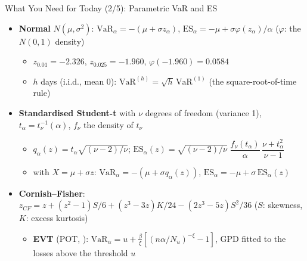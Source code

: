 \begin{frame}{What You Need for Today (2/5): Parametric VaR and ES}
\itemsize{\small}
\begin{itemize}
    \item \textbf{Normal} $N(\mu, \sigma^2)$: $\mathrm{VaR}_\alpha = -(\mu + \sigma z_\alpha)$, $\mathrm{ES}_\alpha = -\mu + \sigma\varphi(z_\alpha)/\alpha$ ($\varphi$: the $N(0,1)$ density)
    \begin{itemize}
        \item $z_{0.01} = -2.326$, $z_{0.025} = -1.960$, $\varphi(-1.960) = 0.0584$
        \item $h$ days (i.i.d., mean 0): $\mathrm{VaR}^{(h)} = \sqrt{h}\,\mathrm{VaR}^{(1)}$ (the square-root-of-time rule)
    \end{itemize}
    \item \textbf{Standardised Student-t} with $\nu$ degrees of freedom (variance 1), $t_\alpha = t_\nu^{-1}(\alpha)$, $f_\nu$ the density of $t_\nu$
    \begin{itemize}
        \item $q_\alpha(z) = t_\alpha\sqrt{(\nu - 2)/\nu}$; \quad $\mathrm{ES}_\alpha(z) = \sqrt{(\nu - 2)/\nu}\;\dfrac{f_\nu(t_\alpha)}{\alpha}\,\dfrac{\nu + t_\alpha^2}{\nu - 1}$
        \item with $X = \mu + \sigma z$: $\mathrm{VaR}_\alpha = -(\mu + \sigma q_\alpha(z))$, $\mathrm{ES}_\alpha = -\mu + \sigma\,\mathrm{ES}_\alpha(z)$
    \end{itemize}
    \item \textbf{Cornish--Fisher}: $z_{CF} = z + (z^2 - 1)S/6 + (z^3 - 3z)K/24 - (2z^3 - 5z)S^2/36$ ($S$: skewness, $K$: excess kurtosis)
    \begin{itemize}
        \item \textbf{EVT} (POT, ): $\mathrm{VaR}_\alpha = u + \frac{\beta}{\xi}[(n\alpha/N_u)^{-\xi} - 1]$, GPD fitted to the losses above the threshold $u$
    \end{itemize}
\end{itemize}
\end{frame}

